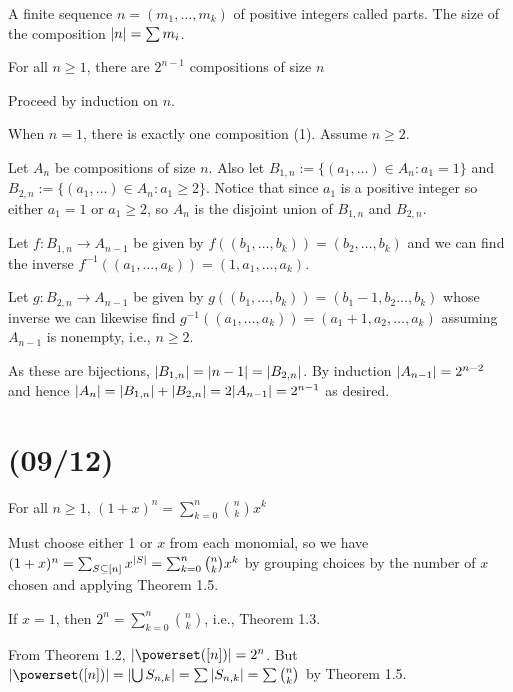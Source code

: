 \documentclass[class=math239,notes]{agony}
\begin{document}
\begin{defn}[composition]
  A finite sequence $n=(m_1,\dotsc,m_k)$ of positive integers called parts.
  The size of the composition $\abs{n} = \sum m_i$.
\end{defn}

\begin{theorem}
  For all $n \geq 1$, there are $2^{n-1}$ compositions of size $n$
\end{theorem}
\begin{prf}
  Proceed by induction on $n$.

  When $n = 1$, there is exactly one composition (1). Assume $n \geq 2$.

  Let $A_n$ be compositions of size $n$.
  Also let $B_{1,n} := \{(a_1,\dotsc) \in A_n : a_1 = 1\}$
  and $B_{2,n} := \{(a_1,\dotsc) \in A_n : a_1 \geq 2\}$.
  Notice that since $a_1$ is a positive integer so either $a_1 = 1$ or $a_1 \geq 2$,
  so $A_n$ is the disjoint union of $B_{1,n}$ and $B_{2,n}$.

  Let $f : B_{1,n} \to A_{n-1}$ be given by $f((b_1,\dotsc,b_k)) = (b_2,\dotsc,b_k)$
  and we can find the inverse $f^{-1}((a_1,\dotsc,a_k)) = (1,a_1,\dotsc,a_k)$.

  Let $g : B_{2,n} \to A_{n-1}$ be given by $g((b_1,\dotsc,b_k)) = (b_1-1,b_2\dotsc,b_k)$
  whose inverse we can likewise find $g^{-1}((a_1,\dotsc,a_k)) = (a_1+1,a_2,\dotsc,a_k)$
  assuming $A_{n-1}$ is nonempty, i.e., $n \geq 2$.

  As these are bijections, $\abs{B_{1,n}} = \abs{n-1} = \abs{B_{2,n}}$.
  By induction $\abs{A_{n-1}} = 2^{n-2}$ and hence
  $\abs{A_n} = \abs{B_{1,n}} + \abs{B_{2,n}} = 2\abs{A_{n-1}} = 2^{n-1}$ as desired.
\end{prf}

\section{(09/12)}

\begin{theorem}
  For all $n \geq 1$, $(1+x)^n = \sum_{k=0}^n \binom{n}{k}x^k$
\end{theorem}
\begin{prf}
  Must choose either 1 or $x$ from each monomial,
  so we have $(1+x)^n = \sum_{S \subseteq [n]} x^{\abs{S}} = \sum_{k=0}^n\binom{n}{k}x^k$
  by grouping choices by the number of $x$ chosen and applying Theorem 1.5.
\end{prf}

\begin{corollary}
  If $x=1$, then $2^n = \sum_{k=0}^n \binom{n}{k}$, i.e., Theorem 1.3.
\end{corollary}
\begin{prf}
  From Theorem 1.2, $\abs{\powerset([n])} = 2^n$.
  But $\abs{\powerset([n])} = \abs{\bigcup S_{n,k}}
    = \sum \abs{S_{n,k}} = \sum \binom{n}{k}$ by Theorem 1.5.
\end{prf}
\end{document}
